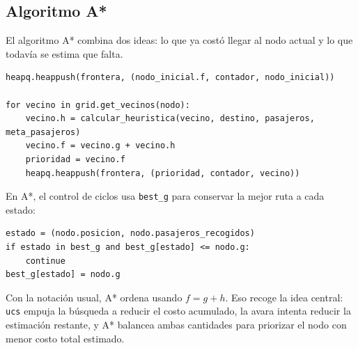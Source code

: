 \documentclass[12pt,a4paper]{article}
\begin{document}
\subsection{Algoritmo A*}
El algoritmo A* combina dos ideas: lo que ya costó llegar al nodo actual y lo que todavía se estima que falta.

\begin{lstlisting}[style=pythonstyle,caption={Implementación de A* (prioridad por f = g + h)}]
heapq.heappush(frontera, (nodo_inicial.f, contador, nodo_inicial))

for vecino in grid.get_vecinos(nodo):
    vecino.h = calcular_heuristica(vecino, destino, pasajeros, meta_pasajeros)
    vecino.f = vecino.g + vecino.h
    prioridad = vecino.f
    heapq.heappush(frontera, (prioridad, contador, vecino))
\end{lstlisting}

En A*, el control de ciclos usa \texttt{best\_g} para conservar la mejor ruta a cada estado:

\begin{lstlisting}[style=pythonstyle,caption={Control de ciclos en A* con best	extunderscore g}]
estado = (nodo.posicion, nodo.pasajeros_recogidos)
if estado in best_g and best_g[estado] <= nodo.g:
    continue
best_g[estado] = nodo.g
\end{lstlisting}

Con la notación usual, A* ordena usando \(f = g + h\). Eso recoge la idea central: \texttt{ucs} empuja la búsqueda a reducir el costo acumulado, la avara intenta reducir la estimación restante, y A* balancea ambas cantidades para priorizar el nodo con menor costo total estimado.
\end{document}
